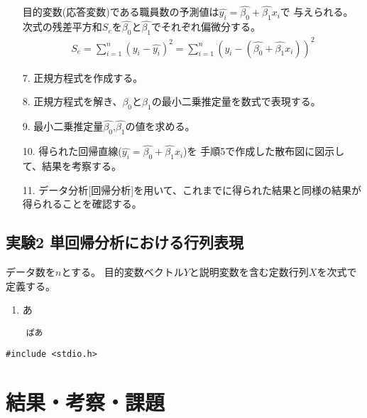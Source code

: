 \documentclass[12pt]{jarticle}
\begin{document}
\begin{itemize}
          目的変数(応答変数)である職員数の予測値は$\hat{y_i}=\hat{\beta_0}+\hat{\beta_1}x_i$で
          与えられる。
          次式の残差平方和$S_e$を$\hat{\beta_0}$と$\hat{\beta_1}$でそれぞれ偏微分する。
          \begin{eqnarray}
              S_e=\sum_{i=1}^{n} (y_i-\hat{y_i})^2 = \sum_{i=1}^{n} (y_i-(\hat{\beta_0}+\hat{\beta_1}x_i))^2
          \end{eqnarray}
    \item [7.]正規方程式を作成する。
    \item [8.]正規方程式を解き、$\beta_0$と$\beta_1$の最小二乗推定量を数式で表現する。
    \item [9.]最小二乗推定量$\hat{\beta_0}$,$\hat{\beta_1}$の値を求める。
    \item [10.]得られた回帰直線($\hat{y_i}=\hat{\beta_0}+\hat{\beta_1}x_i$)を
          手順5で作成した散布図に図示して、結果を考察する。
    \item [11.]データ分析[回帰分析]を用いて、これまでに得られた結果と同様の結果が得られることを確認する。
\end{itemize}

\clearpage

\subsection{実験2 単回帰分析における行列表現}
データ数を$n$とする。
目的変数ベクトル$Y$と説明変数を含む定数行列$X$を次式で定義する。
\begin{enumerate}
    \item あ
\end{enumerate}


\begin{lstlisting}
    ぱあ
\end{lstlisting}
\begin{shadebox}
\end{shadebox}
\begin{lstlisting}[caption=read\_2\_1byte.c,label=read,style = lstR]
    #include <stdio.h>
\end{lstlisting}

\section{結果・考察・課題}
\end{document}
